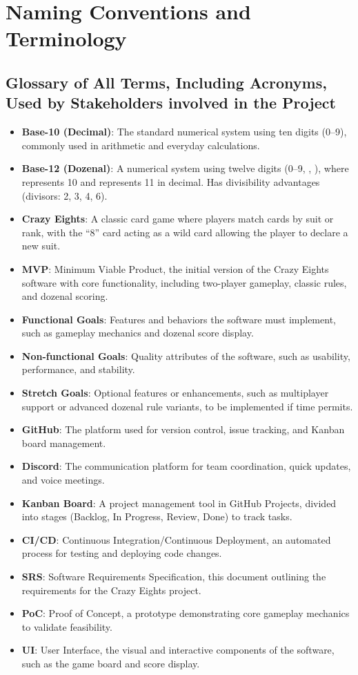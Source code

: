 \documentclass[12pt]{article}
\begin{document}
\section{Naming Conventions and Terminology}
\subsection{Glossary of All Terms, Including Acronyms, Used by Stakeholders
involved in the Project}

\begin{itemize}
    \item \textbf{Base-10 (Decimal)}: The standard numerical system using ten digits (0--9), commonly used in arithmetic and everyday calculations.
    \item \textbf{Base-12 (Dozenal)}: A numerical system using twelve digits (0--9, , ), where  represents 10 and  represents 11 in decimal. Has divisibility advantages (divisors: 2, 3, 4, 6).
    \item \textbf{Crazy Eights}: A classic card game where players match cards by suit or rank, with the ``8'' card acting as a wild card allowing the player to declare a new suit.
    \item \textbf{MVP}: Minimum Viable Product, the initial version of the Crazy Eights software with core functionality, including two-player gameplay, classic rules, and dozenal scoring.
    \item \textbf{Functional Goals}: Features and behaviors the software must implement, such as gameplay mechanics and dozenal score display.
    \item \textbf{Non-functional Goals}: Quality attributes of the software, such as usability, performance, and stability.
    \item \textbf{Stretch Goals}: Optional features or enhancements, such as multiplayer support or advanced dozenal rule variants, to be implemented if time permits.
    \item \textbf{GitHub}: The platform used for version control, issue tracking, and Kanban board management.
    \item \textbf{Discord}: The communication platform for team coordination, quick updates, and voice meetings.
    \item \textbf{Kanban Board}: A project management tool in GitHub Projects, divided into stages (Backlog, In Progress, Review, Done) to track tasks.
    \item \textbf{CI/CD}: Continuous Integration/Continuous Deployment, an automated process for testing and deploying code changes.
    \item \textbf{SRS}: Software Requirements Specification, this document outlining the requirements for the Crazy Eights project.
    \item \textbf{PoC}: Proof of Concept, a prototype demonstrating core gameplay mechanics to validate feasibility.
    \item \textbf{UI}: User Interface, the visual and interactive components of the software, such as the game board and score display.
\end{itemize}
\end{document}

